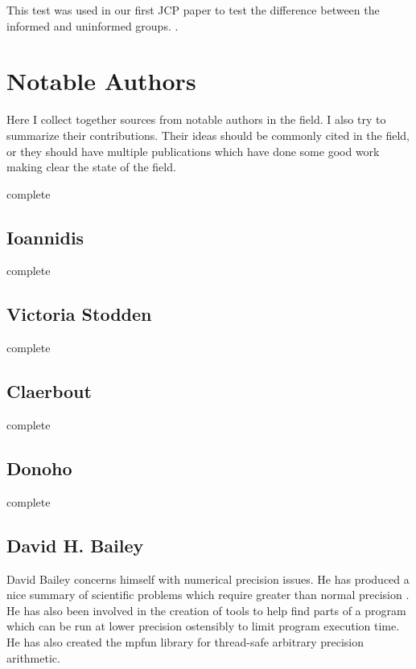 \documentclass{article}
\newcommand{\complete}{
	\gls{complete}
}
\begin{document}
This test was used in our first JCP paper to test the difference between the informed and uninformed groups. \cite{10.2307/2984263,R-pearson-chisquare}.

\section{Notable Authors}

Here I collect together sources from notable authors in the field. I also try to summarize their contributions. Their ideas should be commonly cited in the field, or they should have multiple publications which have done some good work making clear the state of the field.

\complete

\subsection{Ioannidis}

\complete

\subsection{Victoria Stodden}

\complete

\subsection{Claerbout}

\complete

\subsection{Donoho}

\complete

\subsection{David H. Bailey}

David Bailey concerns himself with numerical precision issues. He has produced a nice summary of scientific problems which require greater than normal precision \cite{high-precision-arith-in-science,dhb-zurich-hp}. He has also been involved in the creation of tools to help find parts of a program which can be run at lower precision ostensibly to limit program execution time\cite{blame-analysis}. He has also created the mpfun library for thread-safe arbitrary precision arithmetic\cite{mpfun}.
\end{document}
